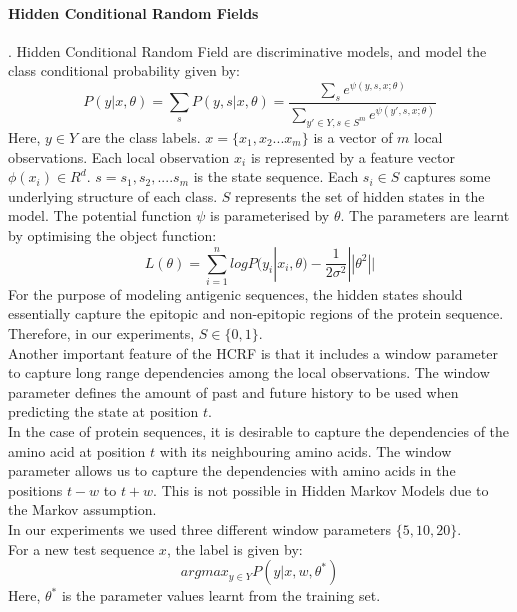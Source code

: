 \documentclass[notitlepage]{article}
\begin{document}
	\paragraph{Hidden Conditional Random Fields}. \newline
	Hidden Conditional Random Field are discriminative models, and model the class conditional probability given by:
	\begin{equation*}
	P(y|x, \theta) = \sum_{s} P(y, s|x, \theta) = \frac{\sum_{s} e^{\psi(y,s,x;\theta)}}{\sum_{y' \in Y,s \in S^{m}}e^{\psi(y',s,x;\theta)}}
	\end{equation*}	
	Here, $y \in Y$ are the class labels. $x = \{x_{1},x_{2}...x_{m}\}$ is a vector of $m$ local observations. Each local observation $x_{i}$ is represented by a feature vector $\phi(x_{i}) \in R^{d}$. $s={s_{1},s_{2},....s_{m}}$ is the state sequence. Each $s_{i} \in S$ captures some underlying structure of each class. $S$ represents the set of hidden states in the model. The potential function $\psi$ is parameterised by $\theta$.
	The parameters are learnt by optimising the object function:
	\begin{equation*}
	L(\theta) = \sum_{i=1}^{n} log P(y_{i} | x_{i}, \theta) - \frac{1}{2 \sigma^{2}} || \theta^{2}||
	\end{equation*}
	For the purpose of modeling antigenic sequences, the hidden states should essentially capture the epitopic and non-epitopic regions of the protein sequence. Therefore, in our experiments, $S \in \{0,1\}$.
	\\Another important feature of the HCRF is that it includes a window parameter to capture long range dependencies among the local observations. The window parameter defines the amount of past and future history to be used when predicting the state at position $t$. 
	\\In the case of protein sequences, it is desirable to capture the dependencies of the amino acid at position $t$ with its neighbouring amino acids. The window parameter allows us to capture the dependencies with amino acids in the positions $t-w$ to $t+w$. This is not possible in Hidden Markov Models due to the Markov assumption.   
	\\ In our experiments we used three different window parameters $\{5,10,20\}$.
	\\For a new test sequence $x$, the label is given by:
	\begin{equation*}
	argmax_{y \in Y} P(y | x, w, \theta^{*})
	\end{equation*}
	Here, $\theta^{*}$ is the parameter values learnt from the training set.
	\cite{item5}
\end{document}
